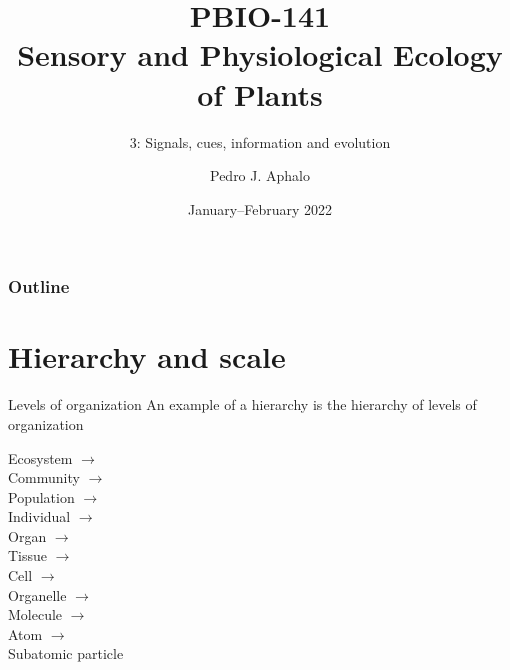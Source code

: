 \documentclass[10pt]{beamer}
\begin{document}
\title{PBIO-141\\Sensory and Physiological Ecology\\ of  Plants}
\subtitle{3: Signals, cues, information and evolution}
\author{Pedro J. Aphalo}
\date{January--February 2022}

  \begin{frame}
    \maketitle
  \end{frame}



  \begin{frame}
    \frametitle{Outline}
    \tableofcontents
  \end{frame}

\section{Hierarchy and scale}
\nocite{Allen1982}

\begin{frame}{Levels of organization}
An example of a hierarchy is the hierarchy of levels of organization

Ecosystem $\rightarrow$\\
\hspace{.5cm}Community $\rightarrow$\\
\hspace{1cm}Population $\rightarrow$\\
\hspace{1.5cm}Individual $\rightarrow$\\
\hspace{2cm}Organ $\rightarrow$\\
\hspace{2.5cm}Tissue $\rightarrow$\\
\hspace{3cm}Cell $\rightarrow$\\
\hspace{3.5cm}Organelle $\rightarrow$\\
\hspace{4cm}Molecule $\rightarrow$\\
\hspace{4.5cm}Atom $\rightarrow$\\
\hspace{5cm}Subatomic particle

\end{frame}
\end{document}
